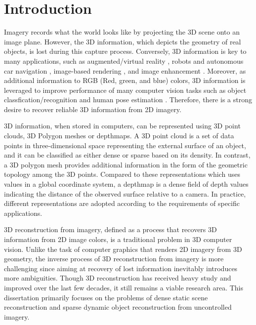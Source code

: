 

\chapter{Introduction}

Imagery records what the world looks like by projecting the 3D scene onto an image plane. However, the 3D information, which depicts the geometry of real objects, is lost during this capture process. Conversely,   3D information is key to many applications, such as augmented/virtual reality \cite{ventura2008depth}, robots and autonomous car navigation \cite{endres2012evaluation}, image-based rendering \cite{View_interpolation1993}, and image enhancement \cite{zhang2014personal}. Moreover, as additional information to RGB (Red, green, and blue) colors, 3D information is leveraged to improve performance of many computer vision tasks such as object classfication/recognition \cite{gupta2013perceptual}  and human pose estimation \cite{CVPR_kinect}. Therefore, there is a strong desire to recover reliable 3D information from 2D imagery.

3D information, when stored in computers, can be represented using 3D point clouds, 3D Polygon meshes or depthmaps. A 3D point cloud is a set of data points in three-dimensional space representing the external surface of an object, and it can be classified as either dense or sparse based on its density. In contrast, a 3D polygon mesh provides additional information in the form of the geometric topology among the 3D points. Compared to these representations which uses values in a global coordinate system, a depthmap is a dense field of depth values indicating the distance of the observed surface relative to a camera. In practice, different representations are adopted according to the requirements of specific applications. 

3D reconstruction from imagery, defined as a process that recovers 3D information from 2D image colors, is a traditional problem in 3D computer vision. Unlike the task of computer graphics that renders 2D imagery from 3D geometry, the inverse process of 3D reconstruction from imagery is more challenging since aiming at recovery of lost information inevitably introduces more ambiguities. Though 3D reconstruction has received heavy study and improved over the last few decades, it still remains a viable research area. This dissertation primarily focuses on the problems of dense static scene reconstruction and sparse dynamic object reconstruction from uncontrolled imagery.

